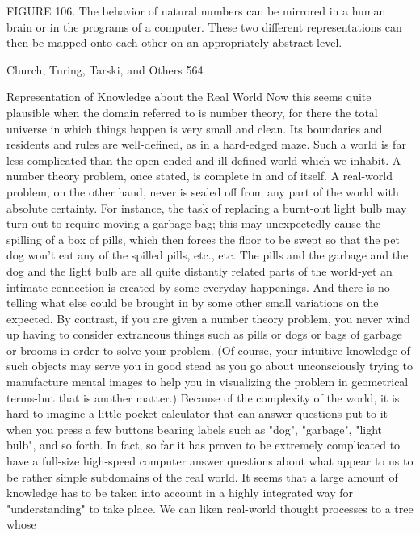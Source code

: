 {FIGURE 106. The behavior of natural numbers can be mirrored in a human brain or in
the programs of a computer. These two different representations can then be mapped
onto each other on an appropriately abstract level.




Church, Turing, Tarski, and Others                                                        564

             Representation of Knowledge about the Real World
Now this seems quite plausible when the domain referred to is number theory, for there
the total universe in which things happen is very small and clean. Its boundaries and
residents and rules are well-defined, as in a hard-edged maze. Such a world is far less
complicated than the open-ended and ill-defined world which we inhabit. A number
theory problem, once stated, is complete in and of itself. A real-world problem, on the
other hand, never is sealed off from any part of the world with absolute certainty. For
instance, the task of replacing a burnt-out light bulb may turn out to require moving a
garbage bag; this may unexpectedly cause the spilling of a box of pills, which then forces
the floor to be swept so that the pet dog won't eat any of the spilled pills, etc., etc. The
pills and the garbage and the dog and the light bulb are all quite distantly related parts of
the world-yet an intimate connection is created by some everyday happenings. And there
is no telling what else could be brought in by some other small variations on the
expected. By contrast, if you are given a number theory problem, you never wind up
having to consider extraneous things such as pills or dogs or bags of garbage or brooms
in order to solve your problem. (Of course, your intuitive knowledge of such objects may
serve you in good stead as you go about unconsciously trying to manufacture mental
images to help you in visualizing the problem in geometrical terms-but that is another
matter.)
        Because of the complexity of the world, it is hard to imagine a little pocket
calculator that can answer questions put to it when you press a few buttons bearing labels
such as "dog", "garbage", "light bulb", and so forth. In fact, so far it has proven to be
extremely complicated to have a full-size high-speed computer answer questions about
what appear to us to be rather simple subdomains of the real world. It seems that a large
amount of knowledge has to be taken into account in a highly integrated way for
"understanding" to take place. We can liken real-world thought processes to a tree whose
}
